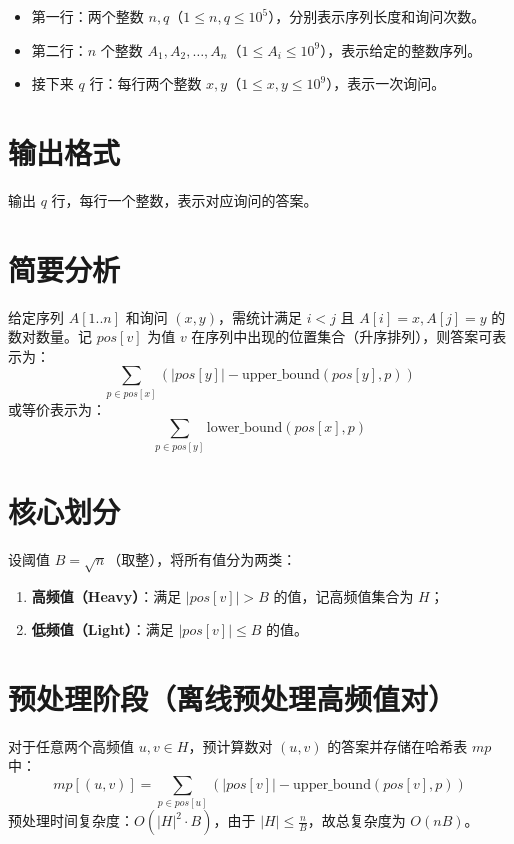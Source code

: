 \documentclass[11pt,a4paper,twocolumn]{ctexart}  %
\begin{document}
\begin{itemize}
    \item 第一行：两个整数 $n, q$（$1 \le n, q \le 10^5$），分别表示序列长度和询问次数。
    \item 第二行：$n$ 个整数 $A_1, A_2, \dots, A_n$（$1 \le A_i \le 10^9$），表示给定的整数序列。
    \item 接下来 $q$ 行：每行两个整数 $x, y$（$1 \le x, y \le 10^9$），表示一次询问。
\end{itemize}

\section*{输出格式}
输出 $q$ 行，每行一个整数，表示对应询问的答案。

\section*{简要分析}
给定序列 $A[1..n]$ 和询问 $(x,y)$，需统计满足 $i<j$ 且 $A[i]=x, A[j]=y$ 的数对数量。记 $pos[v]$ 为值 $v$ 在序列中出现的位置集合（升序排列），则答案可表示为：
$$
\sum_{p \in pos[x]} \left( |pos[y]| - \text{upper\_bound}(pos[y], p) \right)
$$
或等价表示为：
$$
\sum_{p \in pos[y]} \text{lower\_bound}(pos[x], p)
$$

\section*{核心划分}
设阈值 $B = \sqrt{n}$（取整），将所有值分为两类：
\begin{enumerate}
    \item \textbf{高频值（Heavy）}：满足 $|pos[v]| > B$ 的值，记高频值集合为 $H$；
    \item \textbf{低频值（Light）}：满足 $|pos[v]| \le B$ 的值。
\end{enumerate}

\section*{预处理阶段（离线预处理高频值对）}
对于任意两个高频值 $u, v \in H$，预计算数对 $(u,v)$ 的答案并存储在哈希表 $mp$ 中：
$$
mp[(u,v)] = \sum_{p \in pos[u]} \left( |pos[v]| - \text{upper\_bound}(pos[v], p) \right)
$$
预处理时间复杂度：$O(|H|^2 \cdot B)$，由于 $|H| \le \frac{n}{B}$，故总复杂度为 $O(nB)$。
\end{document}
